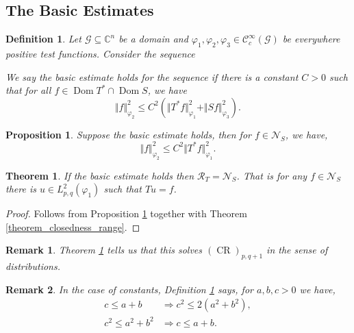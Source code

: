 \documentclass{article}
\newtheorem{theorem}{Theorem} [section]
\newtheorem{proposition}{Proposition}[section]
\newtheorem{definition}{Definition}[section]
\newtheorem{remark}{Remark}[section]
\DeclareMathOperator{\CR}{CR}
\DeclareMathOperator{\Dom}{Dom}
\newcommand{\norm}[1]{\Vert #1 \Vert}
\newcommand{\C}[0]{\mathbb{C}}
\newcommand{\G}[0]{\mathcal{G}}
\newcommand{\ck}[1]{\mathcal{C}^{#1}}
\newcommand{\cinf}[0]{\ck{\infty}}
\begin{document}
\subsection{The Basic Estimates}

\begin{definition}
  Let $\G\subseteq\C^n$ be a domain and $\varphi_1,\varphi_2,\varphi_3\in\cinf_c(\G)$ be everywhere positive test functions. Consider the sequence 
    \begin{center}
  \end{center}
  We say the basic estimate holds for the sequence if there is a constant $C>0$ such that for all $f\in\Dom T^*\cap\Dom S$, we have
  \begin{equation*}
    \norm{f}_{\varphi_2}^2\leq C^2(\norm{T^*f}_{\varphi_1}^2+\norm{Sf}_{\varphi_3}^2).
  \end{equation*}
  \label{definition_basic_estimate}
\end{definition}
\begin{proposition}
  Suppose the basic estimate holds, then for $f\in\mathcal{N}_S$, we have,
  \begin{equation*}
    \norm{f}^2_{\varphi_2}\leq C^2\norm{T^*f}_{\varphi_1}^2.
  \end{equation*}
  \label{proposition_basic_estimate_kernel}
\end{proposition}
\begin{theorem}
  \label{theorem_solution_cr_be}
  If the basic estimate holds then $\mathcal{R}_T = \mathcal{N}_S$. That is for any $f\in\mathcal{N}_S$ there is $u\in L_{p,q}^2(\varphi_1)$ such that $Tu=f$.
\end{theorem}
\begin{proof}
  Follows from Proposition \ref{proposition_basic_estimate_kernel} together with Theorem \ref{theorem_closedness_range}.
\end{proof}
\begin{remark}
  Theorem \ref{theorem_solution_cr_be} tells us that this solves $(\CR)_{p,q+1}$ in the sense of distributions.
\end{remark}
\begin{remark}
  In the case of constants, Definition \ref{definition_basic_estimate} says,
  for $a,b,c>0$ we have,
  \begin{align*}
    c\leq a+b&\Rightarrow c^2\leq 2(a^2+b^2),\\
    c^2\leq a^2+b^2&\Rightarrow c\leq a+b.
  \end{align*}
\end{remark}
\end{document}
